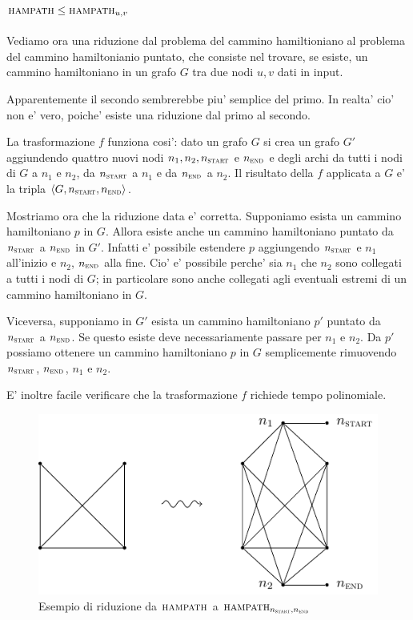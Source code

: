 \subsection{$\textsc{hampath} \leq \textsc{hampath}_{u,v}$}

Vediamo ora una riduzione dal problema del cammino hamiltioniano al problema del cammino
hamiltonianio puntato, che consiste nel trovare, se esiste, un cammino hamiltoniano in un grafo $G$
tra due nodi $u, v$ dati in input.

Apparentemente il secondo sembrerebbe piu' semplice del primo. In realta' cio' non e' vero, poiche'
esiste una riduzione dal primo al secondo.

La trasformazione $f$ funziona cosi': dato un grafo $G$ si crea un grafo $G'$ aggiundendo quattro
nuovi nodi $n_{1}, n_{2}, n_{\textsc{start}}$ e $n_{\textsc{end}}$ e degli archi da tutti i nodi di
$G$ a $n_{1}$ e $n_{2}$, da $n_{\textsc{start}}$ a $n_{1}$ e da $n_{\textsc{end}}$ a $n_{2}$. Il
risultato della $f$ applicata a $G$ e' la tripla $\langle G,n_{\textsc{start}},n_{\textsc{end}} \rangle$.

Mostriamo ora che la riduzione data e' corretta. Supponiamo esista un cammino hamiltoniano $p$ in
$G$. Allora esiste anche un cammino hamiltoniano puntato da $n_{\textsc{start}}$ a
$n_{\textsc{end}}$ in $G'$. Infatti e' possibile estendere $p$ aggiungendo $n_{\textsc{start}}$ e
$n_{1}$ all'inizio e $n_{2}$, $n_{\textsc{end}}$ alla fine. Cio' e' possibile perche' sia $n_{1}$
che $n_{2}$ sono collegati a tutti i nodi di $G$; in particolare sono anche collegati agli eventuali
estremi di un cammino hamiltoniano in $G$.

Viceversa, supponiamo in $G'$ esista un cammino hamiltoniano $p'$ puntato da $n_{\textsc{start}}$ a
$n_{\textsc{end}}$. Se questo esiste deve necessariamente passare per $n_{1}$ e $n_{2}$. Da $p'$
possiamo ottenere un cammino hamiltoniano $p$ in $G$ semplicemente rimuovendo $n_{\textsc{start}}$,
$n_{\textsc{end}}$, $n_{1}$ e $n_{2}$.

E' inoltre facile verificare che la trasformazione $f$ richiede tempo polinomiale.

\begin{figure}[h]
    \begin{center}
        \includegraphics{./img/NPClass/HAM2PHAM.pdf}
        \caption{Esempio di riduzione da $\textsc{hampath}$ a
        $\textsc{hampath}_{n_{\textsc{start}},n_{\textsc{end}}}$}
    \end{center}
\end{figure}

